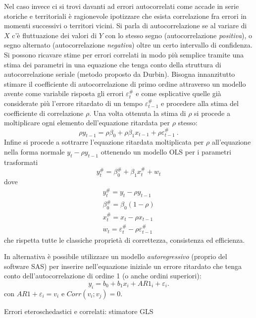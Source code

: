 \documentclass[a4page, 11pt]{article} %
\begin{document}
Nel caso invece ci si trovi davanti ad errori autocorrelati come accade in serie storiche e territoriali è ragionevole ipotizzare che esista correlazione fra errori in momenti successivi o territori vicini. Si parla di autocorrelazione se al variare di $X$ c'è fluttuazione dei valori di $Y$ con lo stesso segno (autocorrelazione \textit{positiva}), o segno alternato (autocorrelazione \textit{negativa}) oltre un certo intervallo di confidenza. Si possono ricavare stime per errori correlati in modo più semplice tramite una stima dei parametri in una equazione che tenga conto della struttura di autocorrelazione seriale (metodo proposto da Durbin). 
Bisogna innanzitutto stimare il coefficiente di autocorrelazione di primo ordine attraverso un modello avente come variabile risposta gli errori $\varepsilon_t^\#$ e come esplicative quelle già considerate più l’errore ritardato di un tempo $\varepsilon_{t-1}^\#$ e procedere alla stima del coefficiente di correlazione $\rho$. Una volta ottenuta la stima di $\rho$ si procede a moltiplicare ogni elemento dell'equazione ritardata per $\rho$ stesso: 
\begin{equation*}
\rho y_{t-1} = \rho\beta_0 + \rho\beta_1 x_{t-1} +\rho\varepsilon_{t-1}^\# \ .
\end{equation*}
Infine si procede a sottrarre l'equazione ritardata moltiplicata per $\rho$ all'equazione nella forma normale $y_t - \rho y_{t-1}$ ottenendo un modello OLS per i parametri trasformati 
\begin{equation*}
y_t^\# = \beta_0^\# + \beta_1 x_t^\# + w_t
\end{equation*} 
dove
\begin{equation*}
\begin{matrix}
y_t^\# = y_t - \rho y_{t-1}\\
\beta_0^\# = \beta_0(1 -\rho)\\
x_t^\# = x_t - \rho x_{t-1}\\
w_t =\varepsilon_t^\# - \rho \varepsilon_{t-1}^\# 
\end{matrix}
\end{equation*}
che rispetta tutte le classiche proprietà di correttezza, consistenza ed efficienza. 

In alternativa è possibile utilizzare un modello \textit{autoregressivo} (proprio del software SAS) per inserire nell’equazione iniziale un errore ritardato che tenga conto dell’autocorrelazione di ordine 1 (o anche ordini superiori): 
\begin{equation*}
y_i=b_0 +b_1 x_i +AR1_i  + \varepsilon_i. 
\end{equation*}
con $AR1 + \varepsilon_i = v_i$ e $Corr(v_i;v_j) = 0$.
\newline
\begin{itshape}
Errori eteroschedastici e correlati: stimatore GLS
\end{itshape}
\end{document}
